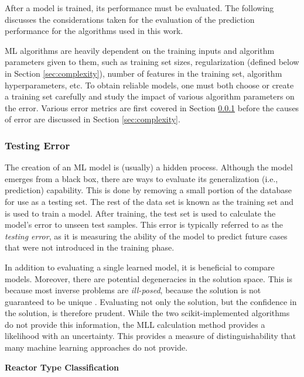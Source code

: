 After a model is trained, its performance must be evaluated. The following
discusses the considerations taken for the evaluation of the prediction
performance for the algorithms used in this work. 

\gls{ML} algorithms are heavily dependent on the training inputs and algorithm
parameters given to them, such as training set sizes, regularization (defined
below in Section \ref{sec:complexity}), number of features in the training set,
algorithm hyperparameters, etc.  To obtain reliable models, one must both
choose or create a training set carefully and study the impact of various
algorithm parameters on the error. Various error metrics are first covered in
Section \ref{sec:testerr} before the causes of error are discussed in Section
\ref{sec:complexity}.

\subsubsection{Testing Error}
\label{sec:testerr}

The creation of an \gls{ML} model is (usually) a hidden process. Although the
model emerges from a black box, there are ways to evaluate its generalization
(i.e., prediction) capability.  This is done by removing a small portion of the
database for use as a testing set.  The rest of the data set is known as the
training set and is used to train a model. After training, the test set is used
to calculate the model's error to unseen test samples.  This error is typically
referred to as the \textit{testing error}, as it is measuring the ability of
the model to predict future cases that were not introduced in the training
phase. 

In addition to evaluating a single learned model, it is beneficial to compare
models. Moreover, there are potential degeneracies in the solution space. This
is because most inverse problems are \textit{ill-posed}, because the solution
is not guaranteed to be unique \cite{skutnik_2016}.  Evaluating not only the
solution, but the confidence in the solution, is therefore prudent. While the
two scikit-implemented algorithms do not provide this information, the
\gls{MLL} calculation method provides a likelihood with an uncertainty. This
provides a measure of distinguishability that many machine learning approaches
do not provide. 

\noindent \textbf{Reactor Type Classification}

